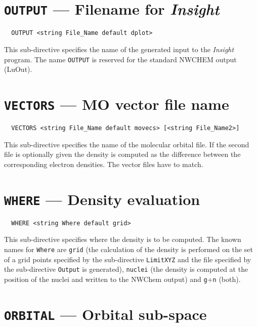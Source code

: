 \section{{\tt OUTPUT} --- Filename for {\em Insight}}

\begin{verbatim}
  OUTPUT <string File_Name default dplot>
\end{verbatim}

This sub-directive specifies the name of the generated input to the
{\em Insight} program. The name \verb+OUTPUT+ is reserved for the
standard NWCHEM output (LuOut).



\section{{\tt VECTORS} --- MO vector file name}

\begin{verbatim}
  VECTORS <string File_Name default movecs> [<string File_Name2>]
\end{verbatim}

This sub-directive specifies the name of the molecular orbital file.
If the second file is optionally given the density is computed as the
difference between the corresponding electron densities. The vector 
files have to match.



\section{{\tt WHERE} --- Density evaluation}

\begin{verbatim}
  WHERE <string Where default grid>
\end{verbatim}

This sub-directive specifies where the density is to be computed.
The known names for \verb+Where+ are \verb+grid+ (the calculation of
the density is performed on the set of a grid points specified by the
sub-directive \verb+LimitXYZ+ and the file specified by the sub-directive
\verb+Output+ is generated), \verb+nuclei+ (the density is computed at
the position of the nuclei and written to the NWChem output) and
\verb+g++\verb+n+ (both).


\section{{\tt ORBITAL} --- Orbital sub-space}

